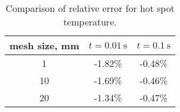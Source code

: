  \begin{table}[H]
    \caption{Comparison of relative error for hot spot temperature.} 
    \vspace{-1.em} 
    \fontsize{10}{10}
    \selectfont 
    \renewcommand{\arraystretch}{1.5}
    \begin{center}
        \begin{tabular}{ ccc }  
        \hline
        mesh size, mm & $t=0.01~\text{s}$ & $t=0.1~\text{s}$ \\
        \hline
        1 & -1.82\% & -0.48\% \\
        10 &  -1.69\% & -0.46\% \\
        20 & -1.34\% & -0.47\% \\
        \hline 
        \end{tabular}
    \end{center}  
     \label{table: 1d_qv_benchmarking_no_insulation_hot_spot_error_conclusion} 
 \end{table}
